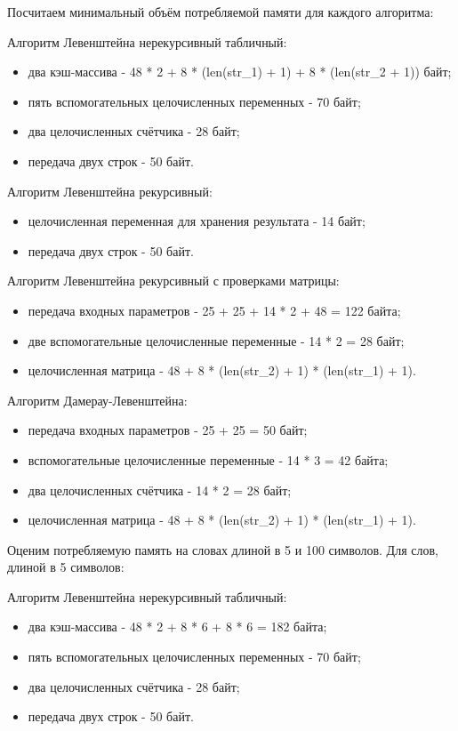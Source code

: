 Посчитаем минимальный объём потребляемой памяти для каждого алгоритма:

Алгоритм Левенштейна нерекурсивный табличный:
\begin{itemize}
	\item два кэш-массива - 48 * 2 + 8 * (len(str\_1) + 1) + 8 * (len(str\_2 + 1)) байт;
	\item пять вспомогательных целочисленных переменных - 70 байт;
	\item два целочисленных счётчика - 28 байт;
	\item передача двух строк - 50 байт.
\end{itemize}

Алгоритм Левенштейна рекурсивный:
\begin{itemize}
	\item целочисленная переменная для хранения результата - 14 байт;
	\item передача двух строк - 50 байт.
\end{itemize}

Алгоритм Левенштейна рекурсивный с проверками матрицы:
\begin{itemize}
	\item передача входных параметров - 25 + 25 + 14 * 2 + 48 = 122 байта;
	\item две вспомогательные целочисленные переменные - 14 * 2 = 28 байт;
	\item целочисленная матрица - 48 + 8 * (len(str\_2) + 1) * (len(str\_1) + 1).
\end{itemize}

Алгоритм Дамерау-Левенштейна:
\begin{itemize}
	\item передача входных параметров - 25 + 25 = 50 байт;
	\item вспомогательные целочисленные переменные - 14 * 3 = 42 байта;
	\item два целочисленных счётчика - 14 * 2 = 28 байт;
	\item целочисленная матрица - 48 + 8 * (len(str\_2) + 1) * (len(str\_1) + 1).
\end{itemize}

Оценим потребляемую память на словах длиной в 5 и 100 символов.
Для слов, длиной в 5 символов:

Алгоритм Левенштейна нерекурсивный табличный:
\begin{itemize}
	\item два кэш-массива - 48 * 2 + 8 * 6 + 8 * 6 = 182 байта;
	\item пять вспомогательных целочисленных переменных - 70 байт;
	\item два целочисленных счётчика - 28 байт;
	\item передача двух строк - 50 байт.
\end{itemize}

